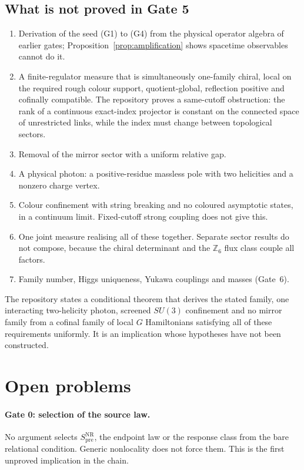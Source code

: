 \documentclass[11pt]{article}
\theoremstyle{definition}
\theoremstyle{remark}
\newcommand{\Spre}{S^{\mathrm{NR}}_{\mathrm{pre}}}
\newcommand{\Z}{\mathbb{Z}}
\begin{document}
\subsection{What is not proved in Gate 5}

\begin{enumerate}
\item Derivation of the seed (G1) to (G4) from the physical operator algebra of earlier
  gates; Proposition~\ref{prop:amplification} shows spacetime observables cannot do it.
\item A finite-regulator measure that is simultaneously one-family chiral, local on the
  required rough colour support, quotient-global, reflection positive and cofinally
  compatible. The repository proves a same-cutoff obstruction: the rank of a continuous
  exact-index projector is constant on the connected space of unrestricted links, while
  the index must change between topological sectors.
\item Removal of the mirror sector with a uniform relative gap.
\item A physical photon: a positive-residue massless pole with two helicities and a
  nonzero charge vertex.
\item Colour confinement with string breaking and no coloured asymptotic states, in a
  continuum limit. Fixed-cutoff strong coupling does not give this.
\item One joint measure realising all of these together. Separate sector results do not
  compose, because the chiral determinant and the $\Z_6$ flux class couple all factors.
\item Family number, Higgs uniqueness, Yukawa couplings and masses (Gate~6).
\end{enumerate}
The repository states a conditional theorem that derives the stated family, one
interacting two-helicity photon, screened $SU(3)$ confinement and no mirror family from a
cofinal family of local $G$ Hamiltonians satisfying all of these requirements uniformly.
It is an implication whose hypotheses have not been constructed.

\section{Open problems}
\label{sec:open}

\paragraph{Gate 0: selection of the source law.} No argument selects
$\Spre$, the endpoint law or the response class from the bare relational condition.
Generic nonlocality does not force them. This is the first unproved implication in the
chain.
\end{document}
